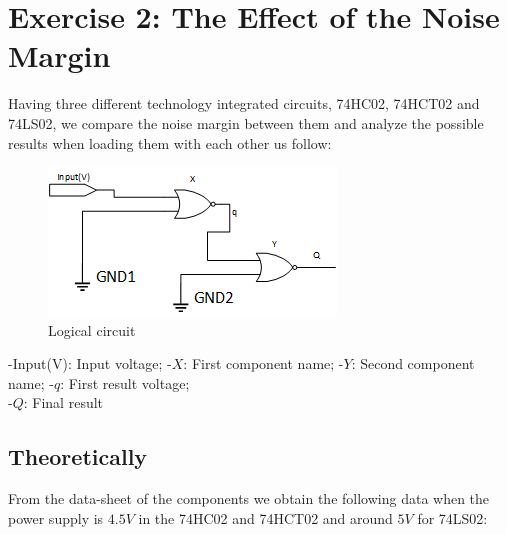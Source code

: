 %

%

%
%
%

\section{\color{olive}Exercise 2: The Effect of the Noise Margin}

Having three different technology integrated circuits, 74HC02, 74HCT02 and 74LS02, we compare the noise margin between them and analyze the possible results when loading them with each other us follow:

 \begin{figure}[h!]
        \centering
        \includegraphics[scale=0.65]{../Exercise2/circuit2.png}
        \caption{\color{cyan}Logical circuit}
        \label{fig:ej2circuit}
    \end{figure}

-Input(V): Input voltage; 
-$X$: First component name; 
-$Y$: Second component name; 
-$q$: First result voltage; \\
-$Q$: Final result

	\subsection{\color{purple}Theoretically}
	
	 From the data-sheet of the components we obtain the following data when the power supply is $4.5V$ in the 74HC02 and 74HCT02 and around $5V$ for 74LS02:
	 
